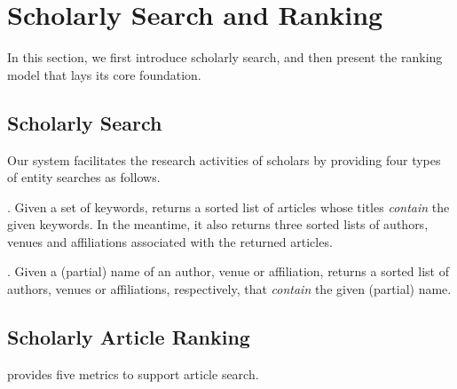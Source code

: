 \section{Scholarly Search and Ranking}   %
\label{sec-model}





In this section, we first introduce scholarly search, and then present the ranking model that lays its core foundation.


\subsection{Scholarly Search}
Our \oursystem system facilitates the research activities of scholars by providing four types of entity searches as follows.


. Given a set of keywords, \oursystem returns a sorted list of  articles whose titles {\em contain} the given keywords. In the meantime, it also returns three sorted lists of authors, venues and affiliations associated with the returned articles.


. Given a (partial) name of an author, venue or affiliation, \oursystem returns a sorted list of  authors, venues or affiliations, respectively, that {\em contain} the given (partial) name.




\subsection{Scholarly Article Ranking}
\label{subsec:rankingMetric}

\oursystem provides five metrics to support article search.



